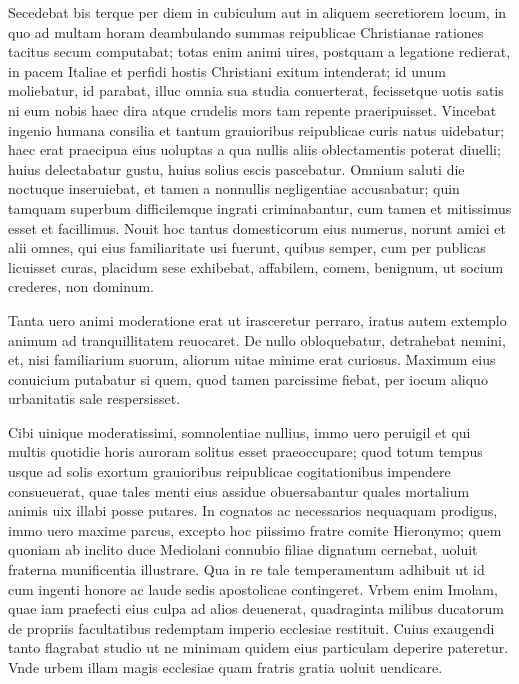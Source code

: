 \documentclass[a5paper,twoside]{article}
\begin{document}
Secedebat bis terque per diem in cubiculum aut in aliquem secretiorem locum, in quo ad multam horam deambulando summas reipublicae Christianae rationes tacitus secum computabat; totas enim animi uires, postquam a legatione redierat, in pacem Italiae et perfidi hostis Christiani exitum %
intenderat; id unum moliebatur, id parabat, illuc omnia sua studia conuerterat, fecissetque uotis satis ni eum nobis haec dira atque crudelis mors tam repente praeripuisset. Vincebat ingenio humana consilia et tantum grauioribus reipublicae curis natus uidebatur; haec erat praecipua eius uoluptas a qua nullis aliis oblectamentis poterat diuelli; huius delectabatur gustu, huius solius escis pascebatur. Omnium saluti die noctuque inseruiebat, et tamen a nonnullis negligentiae accusabatur; quin tamquam superbum difficilemque ingrati criminabantur, cum tamen et mitissimus esset et facillimus. Nouit hoc tantus domesticorum eius numerus, norunt amici et alii omnes, qui eius familiaritate usi fuerunt, quibus semper, cum per publicas licuisset curas, placidum sese exhibebat, affabilem, comem, benignum, ut socium crederes, non dominum.

Tanta uero animi moderatione erat ut irasceretur perraro, iratus autem extemplo animum ad tranquillitatem reuocaret. De nullo obloquebatur, detrahebat nemini, et, nisi familiarium suorum, aliorum uitae minime erat curiosus. Maximum eius conuicium putabatur si quem, quod tamen parcissime fiebat, per iocum aliquo urbanitatis sale respersisset.

Cibi uinique moderatissimi, somnolentiae nullius, immo uero peruigil et qui multis quotidie horis auroram solitus esset praeoccupare; quod totum tempus usque ad solis exortum grauioribus reipublicae cogitationibus impendere consueuerat, quae tales menti eius assidue obuersabantur quales mortalium animis uix illabi posse putares. In cognatos ac necessarios nequaquam prodigus, immo uero maxime parcus, excepto hoc piissimo fratre comite Hieronymo; quem quoniam ab inclito duce Mediolani connubio filiae dignatum cernebat, uoluit fraterna munificentia illustrare.  Qua in re tale temperamentum adhibuit ut id cum ingenti honore ac laude sedis apostolicae contingeret. Vrbem enim Imolam, quae iam praefecti eius culpa ad alios deuenerat, quadraginta milibus ducatorum de propriis facultatibus redemptam imperio ecclesiae restituit. Cuius exaugendi tanto flagrabat studio ut ne minimam quidem eius particulam deperire pateretur. Vnde urbem illam magis ecclesiae quam fratris gratia uoluit uendicare.
\end{document}
